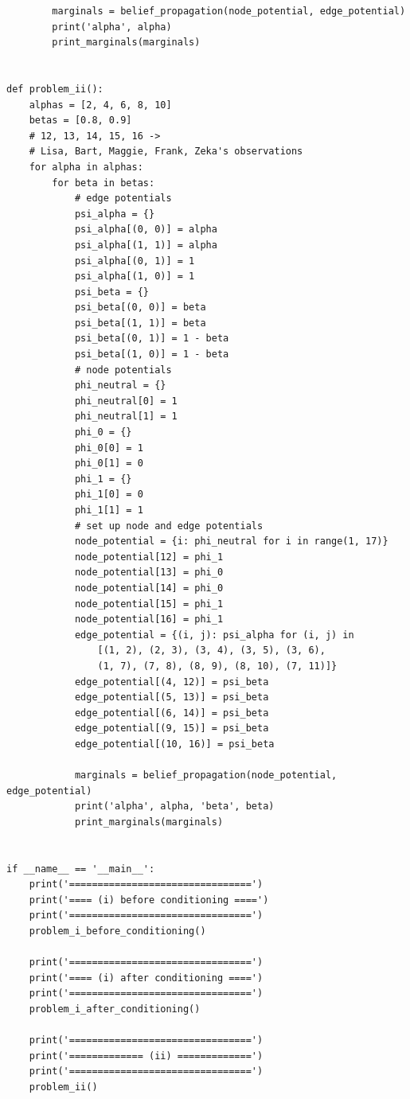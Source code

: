 \documentclass{article}
\begin{document}
\begin{lstlisting}
        marginals = belief_propagation(node_potential, edge_potential)
        print('alpha', alpha)
        print_marginals(marginals)


def problem_ii():
    alphas = [2, 4, 6, 8, 10]
    betas = [0.8, 0.9]
    # 12, 13, 14, 15, 16 ->
    # Lisa, Bart, Maggie, Frank, Zeka's observations
    for alpha in alphas:
        for beta in betas:
            # edge potentials
            psi_alpha = {}
            psi_alpha[(0, 0)] = alpha
            psi_alpha[(1, 1)] = alpha
            psi_alpha[(0, 1)] = 1
            psi_alpha[(1, 0)] = 1
            psi_beta = {}
            psi_beta[(0, 0)] = beta
            psi_beta[(1, 1)] = beta
            psi_beta[(0, 1)] = 1 - beta
            psi_beta[(1, 0)] = 1 - beta
            # node potentials
            phi_neutral = {}
            phi_neutral[0] = 1
            phi_neutral[1] = 1
            phi_0 = {}
            phi_0[0] = 1
            phi_0[1] = 0
            phi_1 = {}
            phi_1[0] = 0
            phi_1[1] = 1
            # set up node and edge potentials
            node_potential = {i: phi_neutral for i in range(1, 17)}
            node_potential[12] = phi_1
            node_potential[13] = phi_0
            node_potential[14] = phi_0
            node_potential[15] = phi_1
            node_potential[16] = phi_1
            edge_potential = {(i, j): psi_alpha for (i, j) in
                [(1, 2), (2, 3), (3, 4), (3, 5), (3, 6),
                (1, 7), (7, 8), (8, 9), (8, 10), (7, 11)]}
            edge_potential[(4, 12)] = psi_beta
            edge_potential[(5, 13)] = psi_beta
            edge_potential[(6, 14)] = psi_beta
            edge_potential[(9, 15)] = psi_beta
            edge_potential[(10, 16)] = psi_beta

            marginals = belief_propagation(node_potential, edge_potential)
            print('alpha', alpha, 'beta', beta)
            print_marginals(marginals)


if __name__ == '__main__':
    print('================================')
    print('==== (i) before conditioning ====')
    print('================================')
    problem_i_before_conditioning()

    print('================================')
    print('==== (i) after conditioning ====')
    print('================================')
    problem_i_after_conditioning()

    print('================================')
    print('============= (ii) =============')
    print('================================')
    problem_ii()

\end{lstlisting}
\end{document}
